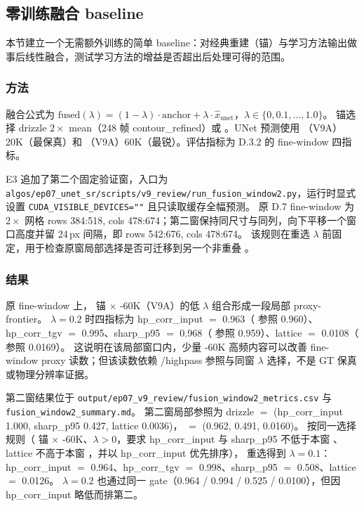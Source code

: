 \subsection{零训练融合 baseline}

本节建立一个无需额外训练的简单 baseline：对经典重建（锚）与学习方法输出做事后线性融合，测试学习方法的增益是否超出后处理可得的范围。

\subsubsection{方法}

融合公式为 \(\text{fused}(\lambda) = (1-\lambda) \cdot \text{anchor} + \lambda \cdot \hat{x}_{\text{unet}}\)，\(\lambda \in \{0, 0.1, \ldots, 1.0\}\)。
锚选择 drizzle \(2\times\) mean（248 帧 contour\_refined）或 。UNet 预测使用 （V9A）20K（最保真）和 （V9A）60K（最锐）。评估指标为 D.3.2 的 fine-window 四指标。

E3 追加了第二个固定验证窗，入口为 \texttt{algos/ep07\_unet\_sr/scripts/v9\_review/run\_fusion\_window2.py}，运行时显式设置 \texttt{CUDA\_VISIBLE\_DEVICES=""} 且只读取缓存全幅预测。
原 D.7 fine-window 为 \(2\times\) 网格 rows 384:518, cols 478:674；第二窗保持同尺寸与同列，向下平移一个窗口高度并留 24\,px 间隔，即 rows 542:676, cols 478:674。
该规则在重选 \(\lambda\) 前固定，用于检查原窗局部选择是否可迁移到另一个非重叠 。

\subsubsection{结果}

原 fine-window 上， 锚 \(\times\) -60K（V9A）的低 \(\lambda\) 组合形成一段局部 proxy-frontier。
\(\lambda = 0.2\) 时四指标为 hp\_corr\_input \(=\) 0.963（ 参照 0.960）、hp\_corr\_tgv \(=\) 0.995、sharp\_p95 \(=\) 0.968（ 参照 0.959）、lattice \(=\) 0.0108（ 参照 0.0169）。
这说明在该局部窗口内，少量 -60K 高频内容可以改善 fine-window proxy 读数；但该读数依赖 /highpass 参照与同窗 \(\lambda\) 选择，不是 GT 保真或物理分辨率证据。

第二窗结果位于 \texttt{output/ep07\_v9\_review/fusion\_window2\_metrics.csv} 与 \texttt{fusion\_window2\_summary.md}。
第二窗局部参照为 drizzle \(=\) (hp\_corr\_input 1.000, sharp\_p95 0.427, lattice 0.0036)， \(=\) (0.962, 0.491, 0.0160)。
按同一选择规则（ 锚 \(\times\) -60K、\(\lambda > 0\)，要求 hp\_corr\_input 与 sharp\_p95 不低于本窗 、lattice 不高于本窗 ，并以 hp\_corr\_input 优先排序），
重选得到 \(\lambda = 0.1\)：hp\_corr\_input \(=\) 0.964、hp\_corr\_tgv \(=\) 0.998、sharp\_p95 \(=\) 0.508、lattice \(=\) 0.0126。
\(\lambda = 0.2\) 也通过同一 gate（0.964 / 0.994 / 0.525 / 0.0100），但因 hp\_corr\_input 略低而排第二。

